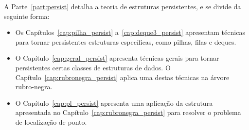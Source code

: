 \documentclass[main.tex]{subfiles}
\begin{document}
A Parte~\ref{part:persist} detalha a teoria de estruturas persistentes, e se divide da seguinte forma:
\begin{itemize}
\item Os Capítulos~\ref{cap:pilha_persist} a~\ref{cap:deque3_persist} apresentam técnicas para tornar persistentes estruturas específicas, como pilhas, filas e deques.
\item O Capítulo~\ref{cap:geral_persist} apresenta técnicas gerais para tornar persistentes certas classes de estruturas de dados. O Capítulo~\ref{cap:rubronegra_persist} aplica uma destas técnicas na árvore rubro-negra.
\item O Capítulo~\ref{cap:pl_persist} apresenta uma aplicação da estrutura apresentada no Capítulo~\ref{cap:rubronegra_persist} para resolver o problema de localização de ponto.
\end{itemize}



\setcounter{secnumdepth}{1}
\end{document}
